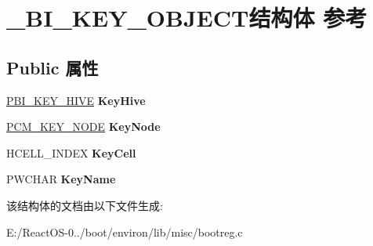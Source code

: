 \hypertarget{struct___b_i___k_e_y___o_b_j_e_c_t}{}\section{\+\_\+\+B\+I\+\_\+\+K\+E\+Y\+\_\+\+O\+B\+J\+E\+C\+T结构体 参考}
\label{struct___b_i___k_e_y___o_b_j_e_c_t}
\subsection*{Public 属性}
\begin{DoxyCompactItemize}
\item 
\mbox{\label{struct___b_i___k_e_y___o_b_j_e_c_t_a917ed01fed9543be9d4531676d6e12ee}} 
\hyperlink{struct___b_i___k_e_y___h_i_v_e}{P\+B\+I\+\_\+\+K\+E\+Y\+\_\+\+H\+I\+VE} {\bfseries Key\+Hive}
\item 
\mbox{\label{struct___b_i___k_e_y___o_b_j_e_c_t_aa01f2b34225f07869b915e8b539cdae5}} 
\hyperlink{struct___c_m___k_e_y___n_o_d_e}{P\+C\+M\+\_\+\+K\+E\+Y\+\_\+\+N\+O\+DE} {\bfseries Key\+Node}
\item 
\mbox{\label{struct___b_i___k_e_y___o_b_j_e_c_t_aab2d74ace126631914b0d9c97913a06d}} 
H\+C\+E\+L\+L\+\_\+\+I\+N\+D\+EX {\bfseries Key\+Cell}
\item 
\mbox{\label{struct___b_i___k_e_y___o_b_j_e_c_t_a9f03de669c7467a6ac59490e91494847}} 
P\+W\+C\+H\+AR {\bfseries Key\+Name}
\end{DoxyCompactItemize}


该结构体的文档由以下文件生成\+:\begin{DoxyCompactItemize}
\item 
E\+:/\+React\+O\+S-\/0../boot/environ/lib/misc/bootreg.\+c\end{DoxyCompactItemize}
